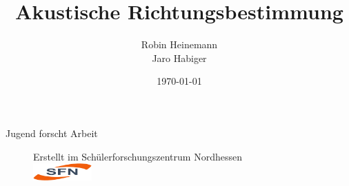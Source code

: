 \documentclass[german,10pt,a4paper]{article}
\title{Akustische Richtungsbestimmung}
\author{Robin Heinemann\\ Jaro Habiger}
\date{\today}
\begin{document}
\begin{centering}
    Jugend forscht Arbeit
  	{\let\newpage\relax\maketitle}
  	\begin{figure}
  		\centering
  		{\large Erstellt im Schülerforschungszentrum Nordhessen}\\
  		\vspace{20pt}
  		\includegraphics[width=0.2\textwidth]{img/sfn}
  	\end{figure}
\end{centering}
\thispagestyle{empty}
\newpage
\tableofcontents

\thispagestyle{empty}

\newpage
\setcounter{page}{1}

\begingroup
\let\clearpage\relax













\endgroup

\pagebreak %
\setcounter{page}{1}
\printbibliography
\end{document}
